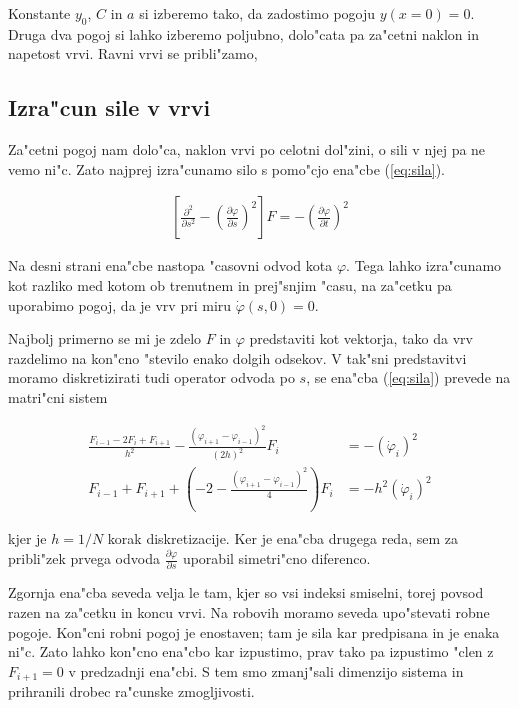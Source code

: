 \documentclass[a4paper,10pt]{article}
\renewcommand{\phi}{\varphi}
\newcommand{\parcialno}[2]{
  \frac{\partial #1}{\partial #2}
}
\newcommand{\parcdva}[2]{
  \frac{\partial^2 #1}{\partial #2 ^2}
}
\begin{document}
Konstante $y_0$, $C$ in $a$ si izberemo tako, da zadostimo pogoju $y(x=0) = 0$. Druga dva pogoj si lahko izberemo poljubno, dolo"cata pa za"cetni naklon in napetost vrvi. Ravni vrvi se pribli"zamo, 



\subsection{Izra"cun sile v vrvi}

Za"cetni pogoj nam dolo"ca, naklon vrvi po celotni dol"zini, o sili v njej pa ne vemo ni"c. Zato najprej izra"cunamo silo s pomo"cjo ena"cbe (\ref{eq:sila}). 

\begin{align}
 \label{eq:sila}
 \left[\parcdva{}{s} - \left(\parcialno{\phi}{s}\right)^2 \right]F = -\left(\parcialno{\phi}{t}\right)^2
\end{align}

Na desni strani ena"cbe nastopa "casovni odvod kota $\phi$. Tega lahko izra"cunamo kot razliko med kotom ob trenutnem in prej"snjim "casu, na za"cetku pa uporabimo pogoj, da je vrv pri miru $\dot \phi(s,0) = 0$. 

Najbolj primerno se mi je zdelo $F$ in $\phi$ predstaviti kot vektorja, tako da vrv razdelimo na kon"cno "stevilo enako dolgih odsekov. V tak"sni predstavitvi moramo diskretizirati tudi operator odvoda po $s$, se ena"cba (\ref{eq:sila}) prevede na matri"cni sistem

\begin{align}
 \label{eq:sila-diskretno}
 \frac{F_{i-1} - 2F_i + F_{i+1}}{h^2} - \frac{(\phi_{i+1} - \phi_{i-1})^2}{(2h)^2}F_i &= -\left(\dot\phi_i\right)^2 \\
 F_{i-1} + F_{i+1} + \left(-2 - \frac{(\phi_{i+1} - \phi_{i-1})^2}{4}\right) F_i &= -h^2 \left(\dot\phi_i\right)^2
\end{align}

kjer je $h=1/N$ korak diskretizacije. Ker je ena"cba drugega reda, sem za pribli"zek prvega odvoda $\parcialno{\phi}{s}$ uporabil simetri"cno diferenco. 

Zgornja ena"cba seveda velja le tam, kjer so vsi indeksi smiselni, torej povsod razen na za"cetku in koncu vrvi. Na robovih moramo seveda upo"stevati robne pogoje. Kon"cni robni pogoj je enostaven; tam je sila kar predpisana in je enaka ni"c. Zato lahko kon"cno ena"cbo kar izpustimo, prav tako pa izpustimo "clen z $F_{i+1} = 0$ v predzadnji ena"cbi. S tem smo zmanj"sali dimenzijo sistema in prihranili drobec ra"cunske zmogljivosti. 
\end{document}
